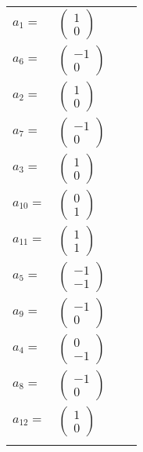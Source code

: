 \documentclass[1p]{elsarticle_modified}
\theoremstyle{definition}
\begin{document}
\begin{tabular}{m{7pt} m{180pt} m{7pt} m{180pt} }
\flushright $a_{1}=$&$\begin{pmatrix}1\\0\end{pmatrix}$ \\
\flushright $a_{6}=$&$\begin{pmatrix}-1\\0\end{pmatrix}$ \\
\flushright $a_{2}=$&$\begin{pmatrix}1\\0\end{pmatrix}$ \\
\flushright $a_{7}=$&$\begin{pmatrix}-1\\0\end{pmatrix}$ \\
\flushright $a_{3}=$&$\begin{pmatrix}1\\0\end{pmatrix}$ \\
\flushright $a_{10}=$&$\begin{pmatrix}0\\1\end{pmatrix}$ \\
\flushright $a_{11}=$&$\begin{pmatrix}1\\1\end{pmatrix}$ \\
\flushright $a_{5}=$&$\begin{pmatrix}-1\\-1\end{pmatrix}$ \\
\flushright $a_{9}=$&$\begin{pmatrix}-1\\0\end{pmatrix}$ \\
\flushright $a_{4}=$&$\begin{pmatrix}0\\-1\end{pmatrix}$ \\
\flushright $a_{8}=$&$\begin{pmatrix}-1\\0\end{pmatrix}$ \\
\flushright $a_{12}=$&$\begin{pmatrix}1\\0\end{pmatrix}$\\&\end{tabular}
\end{document}
